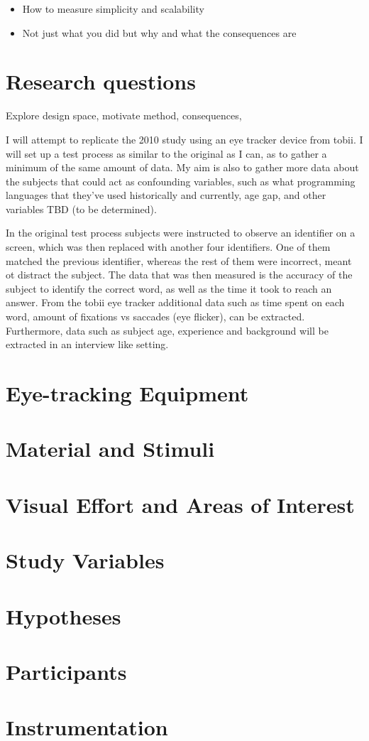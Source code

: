 \begin{itemize}
	\item How to measure simplicity and scalability
	\item Not just what you did but why and what the consequences are
\end{itemize}

\section{Research questions}
Explore design space, motivate method, consequences, 


I will attempt to replicate the 2010 study using an eye tracker device from tobii. I will set up a test process as similar to the original as I can, as to gather a minimum of the same amount of data. My aim is also to gather more data about the subjects that could act as confounding variables, such as what programming languages that they've used historically and currently, age gap, and other variables TBD (to be determined).

In the original test process subjects were instructed to observe an identifier on a screen, which was then replaced with another four identifiers. One of them matched the previous identifier, whereas the rest of them were incorrect, meant ot distract the subject. The data that was then measured is the accuracy of the subject to identify the correct word, as well as the time it took to reach an answer. From the tobii eye tracker additional data such as time spent on each word, amount of fixations vs saccades (eye flicker), can be extracted.
Furthermore, data such as subject age, experience and background will be extracted in an interview like setting.

\section{Eye-tracking Equipment}

\section{Material and Stimuli}

\section{Visual Effort and Areas of Interest}

\section{Study Variables}

\section{Hypotheses}

\section{Participants}

\section{Instrumentation}